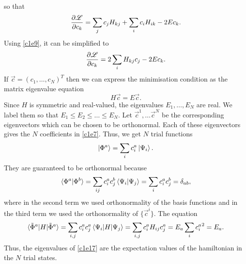so that
\[
\frac{\partial{\mathscr{L}}}{\partial{c_k}} = \sum_jc_jH_{kj} + \sum_ic_iH_{ik} - 2Ec_k.
\]
Using \eqref{c1e9}, it can be simplified to
\begin{equation}\label{c1e16}
\frac{\partial{\mathscr{L}}}{\partial{c_k}} = 2\sum_i H_{kj}c_j - 2Ec_k.
\end{equation}
If $\vec{c} = (c_1, \ldots, c_N)^T$ then we can express the minimisation 
condition as the matrix eigenvalue equation
\begin{equation}\label{c1e17}
H\vec{c} = E\vec{c}.
\end{equation}
Since $H$ is symmetric and real-valued, the eigenvalues $E_1, \ldots, E_N$ are
real. We label them so that $E_1 \le E_2 \le \ldots \le E_N$. Let $\vec{c}^1,
\ldots \vec{c}^N$ be the corresponding eigenvectors which can be chosen to be
orthonormal. Each of these eigenvectors gives the $N$ coefficients in 
\eqref{c1e7}. Thus, we get $N$ trial functions
\begin{equation}\label{c1e18}
\ket{\Phi^a} = \sum_i c^a_i\ket{\Psi_i}.
\end{equation}
They are guaranteed to be orthonormal because
\begin{equation}\label{c1e19}
\braket{\Phi^a|\Phi^b} = \sum_{ij}c^a_ic^b_j\braket{\Psi_i|\Psi_j} = 
\sum_i c^a_ic^b_j = \delta_{ab},
\end{equation}
where in the second term we used orthonormality of the basis functions and in
the third term we used the orthonormality of $\{\vec{c}^i\}$. The equation
\begin{equation}\label{c1e20}
\braket{\tilde{\Phi}^a|H|\tilde{\Phi}^a} = \sum_{i,j}c_i^ac_j^a\braket{
\Psi_i|H|\Psi_j} = \sum_{i,j}c_i^a H_{ij} c_j^a = E_a\sum_i{c_i^a}^2
= E_a.
\end{equation}
Thus, the eigenvalues of \eqref{c1e17} are the expectation values of the 
hamiltonian in the $N$ trial states.

